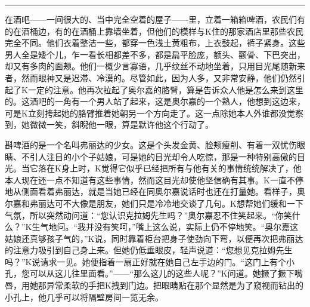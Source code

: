\documentclass[12pt,a4paper]{article}
\begin{document}
\noindent\rule{\textwidth}{0.4pt}

\vspace{0.3em}



在酒吧——一间很大的、当中完全空着的屋子——里，立着一箱箱啤酒，农民们有的在酒桶边，有的在酒桶上靠墙坐着，但他们的模样与K住的那家酒店里那些农民完全不同。他们衣着整洁一些，都穿一色浅土黄粗布，上衣鼓起，裤子紧身。这些男人全是矮个儿，乍一看长相都差不多，都是扁平脸庞，额头、颧骨、下巴突出，却又有多肉的面颊。他们一概少言寡语，几乎纹丝不动地坐着，只用目光尾随新来者，然而眼神又是迟滞、冷漠的。尽管如此，因为人多，又非常安静，他们仍然引起了K一定的注意。他再次拉起了奥尔嘉的胳臂，算是告诉众人他是怎么来到这里的。这酒吧的一角有一个男人站了起来，这是奥尔嘉的一个熟人，他想到这边来，可是K立刻挎起她的胳臂推着她朝另一个方向走了。这一点除她本人外谁都没觉察到，她微微一笑，斜睨他一眼，算是默许他这个行动了。

斟啤酒的是一个名叫弗丽达的少女。这是个头发金黄、脸颊瘦削、有着一双忧伤眼睛、不引人注目的小个子姑娘，可是她的目光却令人吃惊，那是一种特别高傲的目光。当它落在K身上时，K觉得它似乎已经把所有与他有关的事情统统解决了，他本人现在还一点不知道有这些事情，然而这目光却使他坚信确有其事。K一直不停地从侧面看着弗丽达，就是当她已经在同奥尔嘉说话时也还在打量她。看样子，奥尔嘉和弗丽达可不大像是朋友，她们只是冷冷地交谈了几句。K想帮她们缓和一下气氛，所以突然动问道：“您认识克拉姆先生吗？”奥尔嘉忍不住笑起来。“你笑什么？”K生气地问。“我并没有笑呵，”嘴上这么说，实际上仍不停地笑。“奥尔嘉这姑娘还真够孩子气的，”K说，同时靠着柜台把身子使劲向下弯，以便再次把弗丽达的注意力吸引到自己身上来。但她仍低垂眼皮，轻声说道：“您想见克拉姆先生吗？”K说请求一见。她便指着一扇正好就在她自己左手边的门。“这门上有个小孔，您可以从这儿往里面看。”——“那么这儿的这些人呢？”K问道。她撅了撅下嘴唇，用她那异常柔软的手把K拽到门边。把眼睛贴在那个显然是为了窥视而钻出的小孔上，他几乎可以将隔壁房间一览无余。
\end{document}
